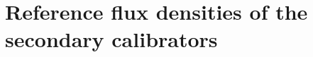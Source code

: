 %
%
\section{Reference flux densities of the secondary calibrators}%
\label{se:ref_flux_secondaries}

%
%


%
